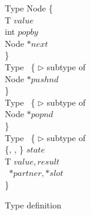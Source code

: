 \begin{figure*}[b]
	\small
	
	Type Node \{ \\
		\hspace*{6mm} T $value$ \\
		\hspace*{6mm} int $popby$ \\
		\hspace*{6mm} Node $*next$ \\
	\} \\
	
	
	Type \pushInfo\ \{ \hspace*{20.0mm} $\triangleright$ subtype of \Info \\
		\hspace*{6mm} Node $*pushnd$ \\
	\} \\
	
	Type \popInfo\ \{ \hspace*{22.0mm} $\triangleright$ subtype of \Info \\
		\hspace*{6mm} Node $*popnd$ \\
	\} \\
	
	
	Type \exInfo\ \{ \hspace*{24.0mm} $\triangleright$ subtype of \Info \\
	\hspace*{6mm} \{\emptyst, \waiting, \busy\} $state$ \\
	\hspace*{6mm} T $value, result$ \\
	\hspace*{6mm} \exInfo\ $*partner, *slot$ \\
	\}
	
	\caption{Type definition}
\end{figure*}



